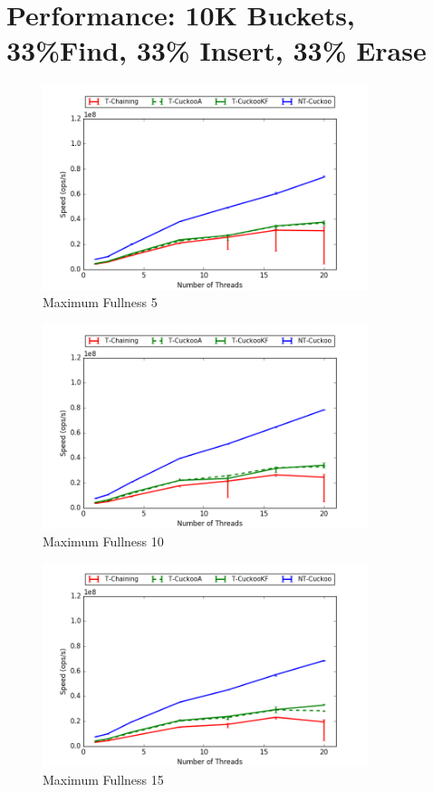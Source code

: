 \section{Performance: 10K Buckets, 33\%Find, 33\% Insert, 33\% Erase}
\begin{figure}[H]
    \centering
	\includegraphics[width=0.85\textwidth]{maps/5HM10K:F34,I33,E33.png} 
        \caption*{Maximum Fullness 5}
    \end{figure}
\begin{figure}[H]
    \centering
	\includegraphics[width=0.85\textwidth]{maps/10HM10K:F34,I33,E33.png} 
        \caption*{Maximum Fullness 10}
    \end{figure}
\begin{figure}[H]
    \centering
	\includegraphics[width=0.85\textwidth]{maps/15HM10K:F34,I33,E33.png} 
        \caption*{Maximum Fullness 15}
    \end{figure}

